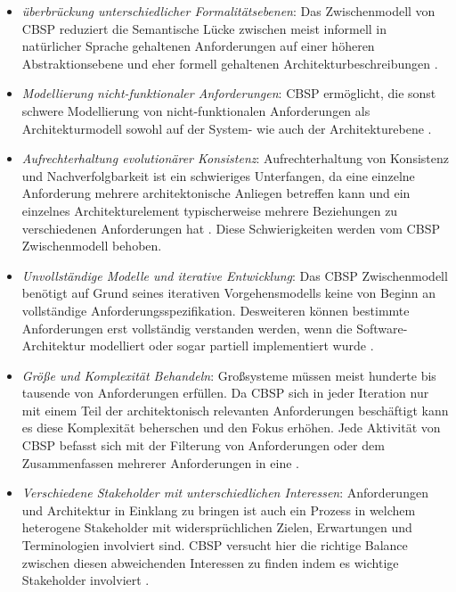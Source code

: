 \begin{itemize}
\item \textit{\"uberbr\"uckung unterschiedlicher Formalit\"atsebenen}: Das Zwischenmodell von CBSP reduziert die Semantische L\"ucke zwischen meist informell in nat\"urlicher Sprache gehaltenen Anforderungen auf einer h\"oheren Abstraktionsebene und eher formell gehaltenen Architekturbeschreibungen \cite{Gru01}.
\item \textit{Modellierung nicht-funktionaler Anforderungen}: CBSP erm\"oglicht, die sonst schwere Modellierung von nicht-funktionalen Anforderungen als Architekturmodell sowohl auf der System- wie auch der Architekturebene \cite{Gru01}. 
\item \textit{Aufrechterhaltung evolution\"arer Konsistenz}: Aufrechterhaltung von Konsistenz und Nachverfolgbarkeit ist ein schwieriges Unterfangen, da eine einzelne Anforderung mehrere architektonische Anliegen betreffen kann und ein einzelnes Architekturelement typischerweise mehrere Beziehungen zu verschiedenen Anforderungen hat \cite{Gru01}. Diese Schwierigkeiten werden vom CBSP Zwischenmodell behoben.
\item \textit{Unvollst\"andige Modelle und iterative Entwicklung}: Das CBSP Zwischenmodell ben\"otigt auf Grund seines iterativen Vorgehensmodells keine von Beginn an vollst\"andige Anforderungsspezifikation. Desweiteren k\"onnen bestimmte Anforderungen erst vollst\"andig verstanden werden, wenn die Software-Architektur modelliert oder sogar partiell implementiert wurde \cite{Gru01}.
\item \textit{Gr\"o\ss{}e und Komplexit\"at Behandeln}: Gro\ss{}systeme m\"ussen meist hunderte bis tausende von Anforderungen erf\"ullen. Da CBSP sich in jeder Iteration nur mit einem Teil der architektonisch relevanten Anforderungen besch\"aftigt kann es diese Komplexit\"at beherschen und den Fokus erh\"ohen. Jede Aktivit\"at von CBSP befasst sich mit der Filterung von Anforderungen oder dem Zusammenfassen mehrerer Anforderungen in eine \cite{Gru01}.
\item \textit{Verschiedene Stakeholder mit unterschiedlichen Interessen}: Anforderungen und Architektur in Einklang zu bringen ist auch ein Prozess in welchem heterogene Stakeholder mit widerspr\"uchlichen Zielen, Erwartungen und Terminologien involviert sind. CBSP versucht hier die richtige Balance zwischen diesen abweichenden Interessen zu finden indem es wichtige Stakeholder involviert \cite{Gru01}. \\
\end{itemize}

